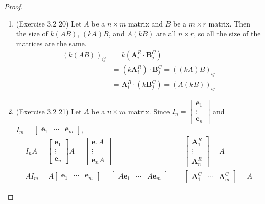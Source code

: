 \begin{proof}
\begin{enumerate}
		\item (Exercise 3.2 20) Let $A$ be a $n \times m$ matrix and $B$ be a $m \times r$ matrix. Then the size of $k(AB)$, $(kA)B$, and $A(kB)$ are all $n \times r$, so all the size of the matrices are the same.
		\begin{align*}
		(k(AB))_{ij} &= k(\textbf{A}^{R}_i \cdot \textbf{B}^{C}_j) \\
		&= (k\textbf{A}^{R}_i) \cdot \textbf{B}^{C}_j = ((kA)B)_{ij} \\
		&= \textbf{A}^{R}_i \cdot (k\textbf{B}^{C}_j) = (A(kB))_{ij}
		\end{align*}
		
		\item (Exercise 3.2 21) Let $A$ be a $n \times m$ matrix. Since $I_n = \begin{bmatrix}
		\textbf{e}_1 \\ \vdots \\ \textbf{e}_n
		\end{bmatrix}$ and $I_m = \begin{bmatrix}
		\textbf{e}_1 & \cdots & \textbf{e}_m
		\end{bmatrix}$,
		\begin{align*}
		I_nA = \begin{bmatrix}
		\textbf{e}_1 \\ \vdots \\ \textbf{e}_n
		\end{bmatrix}A = \begin{bmatrix}
		\textbf{e}_1A \\ \vdots \\ \textbf{e}_nA
		\end{bmatrix}& = \begin{bmatrix}
		\textbf{A}^{R}_1 \\ \vdots \\ \textbf{A}^{R}_n
		\end{bmatrix} = A \\
		AI_m = A\begin{bmatrix}
		\textbf{e}_1 & \cdots & \textbf{e}_m
		\end{bmatrix} = \begin{bmatrix}
		A\textbf{e}_1 & \cdots & A\textbf{e}_m
		\end{bmatrix}& = \begin{bmatrix}
		\textbf{A}^{C}_1 & \cdots & \textbf{A}^{C}_m
		\end{bmatrix} = A
		\end{align*}
	\end{enumerate}	
\end{proof}

